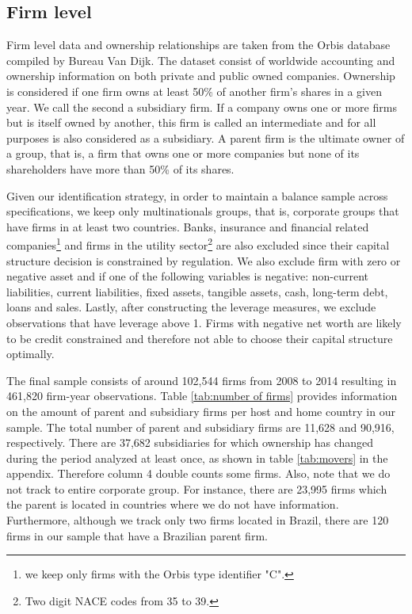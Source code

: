 \documentclass[12pt]{article}
\begin{document}
 	\subsection{Firm level} \label{subsec:firm}
	Firm level data and ownership relationships are taken from the Orbis database compiled by Bureau Van Dijk.	The dataset consist of worldwide accounting and ownership information on both private and public owned companies. Ownership is considered if one firm owns at least 50\% of another firm's shares in a given year. We call the second a subsidiary firm. If a company owns one or more firms but is itself owned by another, this firm is called an intermediate and for all purposes is also considered as a subsidiary. A parent firm is the ultimate owner of a group, that is, a firm that owns one or more companies but none of its shareholders have more than 50\% of its shares.
	
	Given our identification strategy, in order to maintain a balance sample across specifications, we keep only multinationals groups, that is, corporate groups that have firms in at least two countries.  Banks, insurance and financial related companies\footnote{we keep only firms with the Orbis type identifier "C".} and firms in the utility sector\footnote{Two digit NACE codes from 35 to 39.} are also excluded since their capital structure decision is constrained by regulation. We also exclude firm with zero or negative asset and if one of the following variables is negative: non-current liabilities, current liabilities, fixed assets, tangible assets, cash, long-term debt, loans and sales. Lastly, after constructing the leverage measures, we exclude observations that have leverage above 1. Firms with negative net worth are likely to be credit constrained and therefore not able to choose their capital structure optimally. 
	
		\begin{small}
		{
			
		}
	\end{small}

	The final sample consists of around 102,544 firms from 2008 to 2014 resulting in 461,820 firm-year observations. Table \ref{tab:number of firms} provides information on the amount of parent and subsidiary firms per host and home country in our sample. The total number of parent and subsidiary firms are 11,628 and 90,916, respectively. There are 37,682 subsidiaries for which ownership has changed during the period analyzed at least once, as shown in table \ref{tab:movers} in the appendix. Therefore column 4 double counts some firms. Also, note that we do not track to entire corporate group. For instance, there are 23,995 firms which the parent is located in countries where we do not have information. Furthermore, although we track only two firms located in Brazil, there are 120 firms in our sample that have a Brazilian parent firm.  
	
\end{document}

